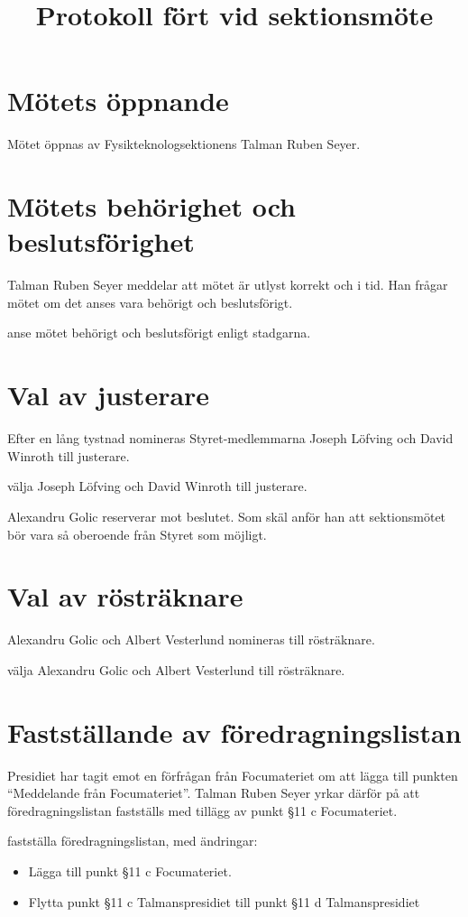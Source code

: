 \documentclass[hidelinks]{sektionsmote}
\title{Protokoll fört vid sektionsmöte}
\begin{document}
\maketitle

\section{Mötets öppnande}
Mötet öppnas \tid av Fysikteknologsektionens Talman Ruben Seyer.


\section{Mötets behörighet och beslutsförighet}
Talman Ruben Seyer meddelar att mötet är utlyst korrekt och i tid.
Han frågar mötet om det anses vara behörigt och beslutsförigt.
\begin{beslut}
    \item anse mötet behörigt och beslutsförigt enligt stadgarna.
\end{beslut}


\section{Val av justerare}
Efter en lång tystnad nomineras Styret-medlemmarna Joseph Löfving och David Winroth till justerare.
\begin{beslut}
    \item välja Joseph Löfving och David Winroth till justerare.
\end{beslut}
Alexandru Golic reserverar mot beslutet.
Som skäl anför han att sektionsmötet bör vara så oberoende från Styret som möjligt.


\section{Val av rösträknare}
Alexandru Golic och Albert Vesterlund nomineras till rösträknare.
\begin{beslut}
    \item välja Alexandru Golic och Albert Vesterlund till rösträknare.
\end{beslut}


\section{Fastställande av föredragningslistan}
Presidiet har tagit emot en förfrågan från Focumateriet om att lägga till punkten \enquote{Meddelande från Focumateriet}.
Talman Ruben Seyer yrkar därför på att föredragningslistan fastställs med tillägg av punkt §11 c Focumateriet.
\begin{beslut}
    \item fastställa föredragningslistan, med ändringar: 
    \begin{itemize}
        \item Lägga till punkt §11 c Focumateriet.
        \item Flytta punkt §11 c Talmanspresidiet till punkt §11 d Talmanspresidiet
    \end{itemize}
\end{beslut}
\end{document}
